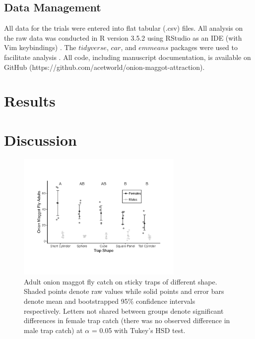 \documentclass[alpha-refs]{wiley-article}
\begin{document}
\subsection{Data Management}

All data for the trials were entered into flat tabular (.csv) files.  All analysis on the raw data was conducted in R version 3.5.2 using RStudio as an IDE (with Vim keybindings) \citep{rcore2018,rstudio}.  The $tidyverse$, $car$, and $emmeans$ packages were used to facilitate analysis \citep{tidy, car, emmeans}.  All code, including manuscript documentation, is available on GitHub (https://github.com/acetworld/onion-maggot-attraction).

\section{Results}


\section{Discussion}

\begin{figure}[bt]
\centering
\includegraphics[width = 8cm]{figures/publication/figure-1.pdf}
\caption{Adult onion maggot fly catch on sticky traps of different shape.  Shaded points denote raw values while solid points and error bars denote mean and bootstrapped 95\% confidence intervals respectively.  Letters not shared between groups denote significant differences in female trap catch (there was no observed difference in male trap catch) at $\alpha$ = 0.05 with Tukey's HSD test. }
\label{fig:figure1}
\end{figure}
\end{document}
